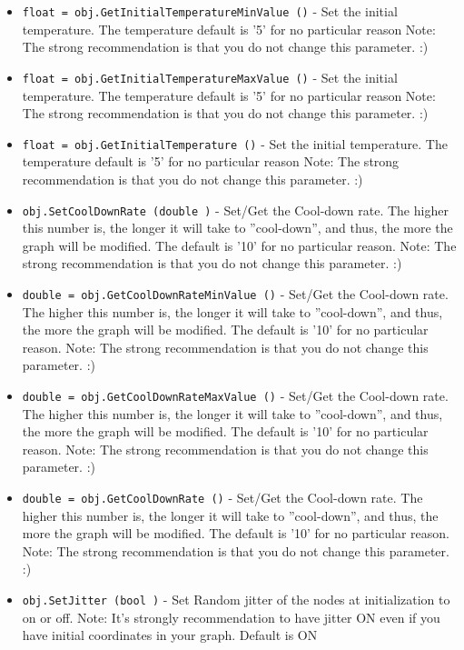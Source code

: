 \begin{itemize}
\item  \verb|float = obj.GetInitialTemperatureMinValue ()| -  Set the initial temperature.  The temperature default is '5'
 for no particular reason
 Note: The strong recommendation is that you do not change
 this parameter. :)

\item  \verb|float = obj.GetInitialTemperatureMaxValue ()| -  Set the initial temperature.  The temperature default is '5'
 for no particular reason
 Note: The strong recommendation is that you do not change
 this parameter. :)

\item  \verb|float = obj.GetInitialTemperature ()| -  Set the initial temperature.  The temperature default is '5'
 for no particular reason
 Note: The strong recommendation is that you do not change
 this parameter. :)

\item  \verb|obj.SetCoolDownRate (double )| -  Set/Get the Cool-down rate.
 The higher this number is, the longer it will take to ''cool-down'',
 and thus, the more the graph will be modified. The default is '10'
 for no particular reason. 
 Note: The strong recommendation is that you do not change
 this parameter. :)

\item  \verb|double = obj.GetCoolDownRateMinValue ()| -  Set/Get the Cool-down rate.
 The higher this number is, the longer it will take to ''cool-down'',
 and thus, the more the graph will be modified. The default is '10'
 for no particular reason. 
 Note: The strong recommendation is that you do not change
 this parameter. :)

\item  \verb|double = obj.GetCoolDownRateMaxValue ()| -  Set/Get the Cool-down rate.
 The higher this number is, the longer it will take to ''cool-down'',
 and thus, the more the graph will be modified. The default is '10'
 for no particular reason. 
 Note: The strong recommendation is that you do not change
 this parameter. :)

\item  \verb|double = obj.GetCoolDownRate ()| -  Set/Get the Cool-down rate.
 The higher this number is, the longer it will take to ''cool-down'',
 and thus, the more the graph will be modified. The default is '10'
 for no particular reason. 
 Note: The strong recommendation is that you do not change
 this parameter. :)

\item  \verb|obj.SetJitter (bool )| -  Set Random jitter of the nodes at initialization
 to on or off.
 Note: It's strongly recommendation to have jitter ON
 even if you have initial coordinates in your graph. 
 Default is ON


\end{itemize}
